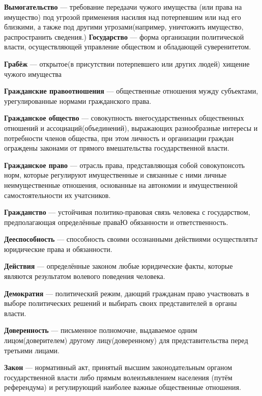 \documentclass[a4paper, 12pt]{article}
\begin{document}
        \textbf{Вымогательство} --- требование передаачи чужого имущества (или права на имущество) под угрозой применения насилия над потерпевшим или над его близкими, а также под другими угрозами(например, уничтожить имущество, распространить сведения.)
        \textbf{Государство} --- форма организации политической власти, осуществляющей управление обществом и обладающей суверенитетом. \par
        \textbf{Грабёж} --- открытое(в присутствии потерпевшего или других людей) хищение чужого имущества \par
        \textbf{Гражданские правоотношения} --- общественные отношения мужду субъектами, урегулированные нормами гражданского права. \par
        \textbf{Гражданское общество} --- совокупность внегосударственных общественных отношений и ассоциаций(объединений), выражающих разнообразные интересы и потребности членов общества, при этом личность и организации граждан ограждены законами от прямого вмешательства государственной власти. \par
        \textbf{Гражданское право} --- отрасль права, представляющая собой совокупонсоть норм, которые регулируют имущественные и связанные с ними личные неимущественные отношения, основанные на автономии и имущественной самостоятельности их учатсников. \par
        \textbf{Гражданство} --- устойчивая политико-правовая связь человека с государством, предполагающая определённые праваЮ обязанности и ответственность. \par
        \textbf{Дееспособность} --- способность своими осознанными действиями осуществлятьт юридические права и обязанности. \par
        \textbf{Действия} --- определённые законом любые юридические факты, которые являются результатом волевого поведения человека.  \par
        \textbf{Демократия} --- политический режим, дающий гражданам право участвовать в выборе политических решений и выбирать своих представителей в органы власти. \par
        \textbf{Доверенность} --- письменное полномочие, выдаваемое одним лицом(доверителем) другому лицу(доверенному) для представительства перед третьими лицами. \par
        \textbf{Закон} --- нормативный акт, принятый высшим законодательным органом государственной власти либо прямым волеизъявлением населения (путём референдума) и регулирующий наиболее важные общественные отношения. \par
\end{document}
